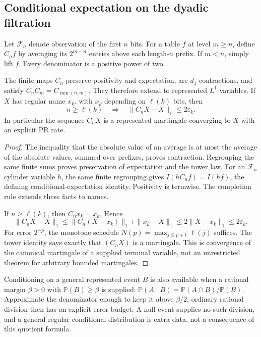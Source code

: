 \subsection{Conditional expectation on the dyadic filtration}

Let $\mathcal F_n$ denote observation of the first $n$ bits. For a table $f$
at level $m\ge n$, define $C_n f$ by averaging its $2^{m-n}$ entries above
each length-$n$ prefix. If $m<n$, simply lift $f$. Every denominator is a
positive power of two.

\begin{theorem}
The finite maps $C_n$ preserve positivity and expectation, are $d_1$
contractions, and satisfy $C_nC_m=C_{\min(n,m)}$. They therefore extend to
represented $L^1$ variables. If $X$ has regular name $x_k$, with $x_k$
depending on $\ell(k)$ bits, then
\[
 n\ge\ell(k)\quad\Longrightarrow\quad
 \|C_nX-X\|_1\le2\varepsilon_k.
\]
In particular the sequence $C_nX$ is a represented martingale converging to
$X$ with an explicit PR rate.
\end{theorem}
\begin{proof}
The inequality that the absolute value of an average is at most the average
of the absolute values, summed over prefixes, proves contraction. Regrouping
the same finite sums proves preservation of expectation and the tower law.
For an $\mathcal F_n$ cylinder variable $h$, the same finite regrouping gives
$I(hC_n f)=I(hf)$, the defining conditional-expectation identity. Positivity
is termwise. The completion rule extends these facts to names.

If $n\ge\ell(k)$, then $C_n x_k=x_k$. Hence
\[
 \|C_nX-X\|_1
 \le\|C_n(X-x_k)\|_1+\|x_k-X\|_1
 \le2\|X-x_k\|_1\le2\varepsilon_k.
\]
For error $2^{-p}$, the monotone schedule
$N(p)=\max_{j\le p+1}\ell(j)$ suffices. The tower identity says exactly that
$(C_nX)$ is a martingale. This is convergence of the canonical martingale of
a supplied terminal variable, not an unrestricted theorem for arbitrary
bounded martingales.
\end{proof}

Conditioning on a general represented event $B$ is also available when a
rational margin $\beta>0$ with $\mathbb P(B)\ge\beta$ is supplied:
$\mathbb P(A\mid B)=\mathbb P(A\cap B)/\mathbb P(B)$. Approximate the
denominator enough to keep it above $\beta/2$; ordinary rational division
then has an explicit error budget. A null event supplies no such division,
and a general regular conditional distribution is extra data, not a consequence
of this quotient formula.

